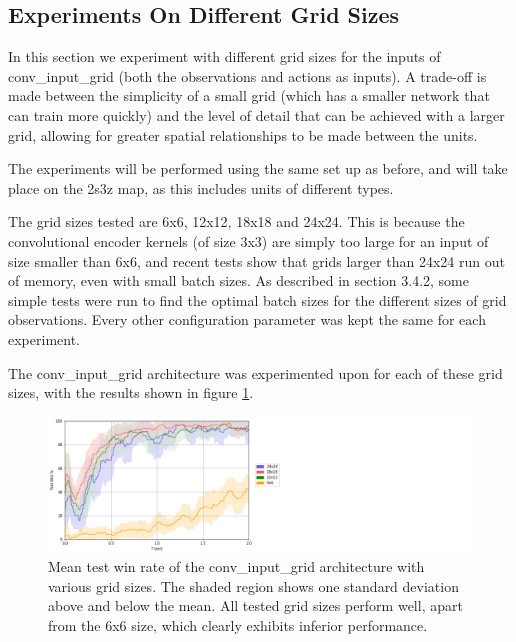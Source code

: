 \subsection{Experiments On Different Grid Sizes}
In this section we experiment with different grid sizes for the inputs of conv\_input\_grid (both the observations and actions as inputs). A trade-off is made between the simplicity of a small grid (which has a smaller network that can train more quickly) and the level of detail that can be achieved with a larger grid, allowing for greater spatial relationships to be made between the units.

The experiments will be performed using the same set up as before, and will take place on the 2s3z map, as this includes units of different types.



The grid sizes tested are 6x6, 12x12, 18x18 and 24x24. This is because the convolutional encoder kernels (of size 3x3) are simply too large for an input of size smaller than 6x6, and recent tests show that grids larger than 24x24 run out of memory, even with small batch sizes. As described in section 3.4.2, some simple tests were run to find the optimal batch sizes for the different sizes of grid observations. Every other configuration parameter was kept the same for each experiment.





The conv\_input\_grid architecture was experimented upon for each of these grid sizes, with the results shown in figure \ref{fig:gridsizes}.


\begin{figure}
    \centering
    \hbox{\hspace{5em}\includegraphics[scale=0.5]{images/graphs/grids.png}}
    \caption{Mean test win rate of the conv\_input\_grid architecture with various grid sizes. The shaded region shows one standard deviation above and below the mean. All tested grid sizes perform well, apart from the 6x6 size, which clearly exhibits inferior performance.}
    \label{fig:gridsizes}
\end{figure}

